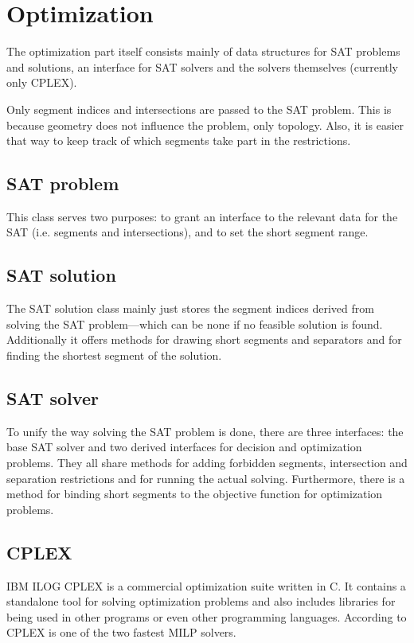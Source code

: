 \section{Optimization}
The optimization part itself consists mainly of data structures for
SAT problems and solutions, an interface for SAT solvers and the
solvers themselves (currently only CPLEX).

Only segment indices and intersections are passed to the SAT problem.
This is because geometry does not influence the problem, only
topology. Also, it is easier that way to keep track of which segments
take part in the restrictions.

\subsection{SAT problem}
This class serves two purposes: to grant an interface to the relevant
data for the SAT (i.e. segments and intersections), and to set the
short segment range.

\subsection{SAT solution}
The SAT solution class mainly just stores the segment indices derived
from solving the SAT problem---which can be none if no feasible
solution is found. Additionally it offers methods for drawing short
segments and separators and for finding the shortest segment of the
solution.

\subsection{SAT solver}
To unify the way solving the SAT problem is done, there are three
interfaces: the base SAT solver and two derived interfaces for
decision and optimization problems. They all share methods for adding
forbidden segments, intersection and separation restrictions and for
running the actual solving. Furthermore, there is a method for binding
short segments to the objective function for optimization problems.

\subsection{CPLEX}
\label{sec:cplex}
IBM ILOG CPLEX \cite{cplex}
is a commercial optimization suite written in C. It contains a
standalone tool for solving optimization problems and also includes
libraries for being used in other programs or even other programming
languages. According to \cite{cplex_benchmark}
CPLEX is one of the two fastest MILP solvers.

